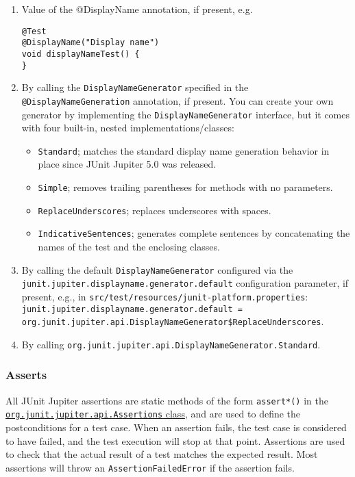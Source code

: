 \documentclass[8pt, table, xcdraw]{article}%
\begin{document}
\begin{enumerate}
    \item Value of the @DisplayName annotation, if present, e.g.
    \begin{lstlisting}
@Test
@DisplayName("Display name")
void displayNameTest() {
}
    \end{lstlisting}
    \item By calling the \lstinline{DisplayNameGenerator} specified in the \lstinline{@DisplayNameGeneration} annotation, if present.
    You can create your own generator by implementing the \lstinline{DisplayNameGenerator} interface, but it comes with four built-in, nested implementations/classes:
    \begin{itemize}
        \item \lstinline{Standard}; matches the standard display name generation behavior in place since JUnit Jupiter 5.0 was released.
        \item \lstinline{Simple}; removes trailing parentheses for methods with no parameters.
        \item \lstinline{ReplaceUnderscores}; replaces underscores with spaces.
        \item \lstinline{IndicativeSentences}; generates complete sentences by concatenating the names of the test and the enclosing classes.
    \end{itemize}
    \item By calling the default \lstinline{DisplayNameGenerator} configured via the \lstinline{junit.jupiter.displayname.generator.default} configuration parameter, if present, e.g., in \lstinline{src/test/resources/junit-platform.properties}: \lstinline{junit.jupiter.displayname.generator.default = org.junit.jupiter.api.DisplayNameGenerator$ReplaceUnderscores}.
    \item By calling \lstinline{org.junit.jupiter.api.DisplayNameGenerator.Standard}.
\end{enumerate}

\subsubsection{Asserts}

All JUnit Jupiter assertions are static methods of the form \lstinline{assert*()} in the \href{https://junit.org/junit5/docs/5.0.1/api/org/junit/jupiter/api/Assertions.html}{\lstinline{org.junit.jupiter.api.Assertions} class}, and are used to define the postconditions for a test case. When an assertion fails, the test case is considered to have failed, and the test execution will stop at that point. Assertions are used to check that the actual result of a test matches the expected result. Most assertions will throw an \lstinline{AssertionFailedError} if the assertion fails.
\end{document}
